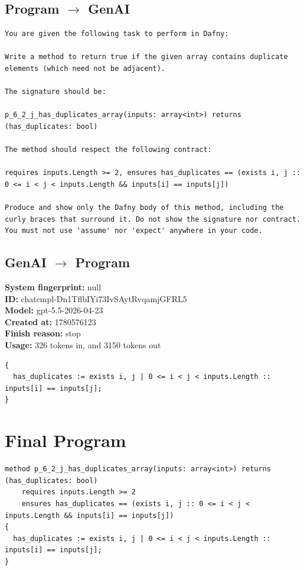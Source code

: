 \documentclass{article}
\begin{document}
\subsection*{Program $\rightarrow$ GenAI}
\begin{lstlisting}
You are given the following task to perform in Dafny:

Write a method to return true if the given array contains duplicate elements (which need not be adjacent).

The signature should be:

p_6_2_j_has_duplicates_array(inputs: array<int>) returns (has_duplicates: bool)

The method should respect the following contract:

requires inputs.Length >= 2, ensures has_duplicates == (exists i, j :: 0 <= i < j < inputs.Length && inputs[i] == inputs[j])

Produce and show only the Dafny body of this method, including the curly braces that surround it. Do not show the signature nor contract. You must not use 'assume' nor 'expect' anywhere in your code.
\end{lstlisting}
\subsection*{GenAI $\rightarrow$ Program}
\textbf{System fingerprint: }null
\\\textbf{ID: }chatcmpl-Dn1TflbIYi73IvSAytRvqamjGFRL5
\\\textbf{Model: }gpt-5.5-2026-04-23
\\\textbf{Created at: }1780576123
\\\textbf{Finish reason: }stop
\\\textbf{Usage: }326 tokens in, and 3150 tokens out
\begin{lstlisting}
{
  has_duplicates := exists i, j | 0 <= i < j < inputs.Length :: inputs[i] == inputs[j];
}
\end{lstlisting}
\section*{Final Program}
\begin{lstlisting}
method p_6_2_j_has_duplicates_array(inputs: array<int>) returns (has_duplicates: bool)
	requires inputs.Length >= 2
	ensures has_duplicates == (exists i, j :: 0 <= i < j < inputs.Length && inputs[i] == inputs[j])
{
  has_duplicates := exists i, j | 0 <= i < j < inputs.Length :: inputs[i] == inputs[j];
}
\end{lstlisting}
\end{document}
